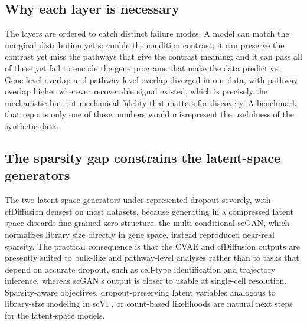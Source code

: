 \documentclass[11pt]{article}
\begin{document}
\subsection{Why each layer is necessary}
The layers are ordered to catch distinct failure modes. A model can match the marginal distribution yet scramble the condition contrast; it can preserve the contrast yet miss the pathways that give the contrast meaning; and it can pass all of these yet fail to encode the gene programs that make the data predictive. Gene-level overlap and pathway-level overlap diverged in our data, with pathway overlap higher wherever recoverable signal existed, which is precisely the mechanistic-but-not-mechanical fidelity that matters for discovery. A benchmark that reports only one of these numbers would misrepresent the usefulness of the synthetic data.

\subsection{The sparsity gap constrains the latent-space generators}
The two latent-space generators under-represented dropout severely, with cfDiffusion densest on most datasets, because generating in a compressed latent space discards fine-grained zero structure; the multi-conditional scGAN, which normalizes library size directly in gene space, instead reproduced near-real sparsity. The practical consequence is that the CVAE and cfDiffusion outputs are presently suited to bulk-like and pathway-level analyses rather than to tasks that depend on accurate dropout, such as cell-type identification and trajectory inference, whereas scGAN's output is closer to usable at single-cell resolution. Sparsity-aware objectives, dropout-preserving latent variables analogous to library-size modeling in scVI \cite{scvi}, or count-based likelihoods are natural next steps for the latent-space models.
\end{document}
